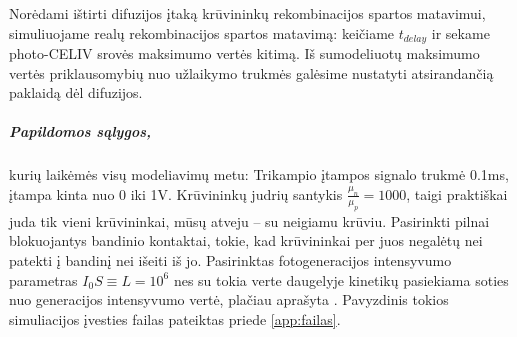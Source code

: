 Norėdami ištirti difuzijos įtaką krūvininkų rekombinacijos spartos matavimui, simuliuojame realų rekombinacijos spartos matavimą: keičiame \(t_{delay}\) ir sekame photo-CELIV srovės maksimumo vertės kitimą. Iš sumodeliuotų maksimumo vertės priklausomybių nuo užlaikymo trukmės galėsime nustatyti atsirandančią paklaidą dėl difuzijos.

\subparagraph*{Papildomos sąlygos,}\label{page:params} kurių laikėmės visų modeliavimų metu: Trikampio įtampos signalo trukmė 0.1ms, įtampa kinta nuo 0 iki 1V. Krūvininkų judrių santykis \(\frac{\mu_n}{\mu_p} = 1000\), taigi praktiškai juda tik vieni krūvininkai, mūsų atveju -- su neigiamu krūviu. Pasirinkti pilnai blokuojantys bandinio kontaktai, tokie, kad krūvininkai per juos negalėtų nei patekti į bandinį  nei išeiti iš jo.
Pasirinktas fotogeneracijos intensyvumo parametras \(I_0 S \equiv L = 10^6 \) nes su tokia verte daugelyje kinetikų pasiekiama soties nuo generacijos intensyvumo vertė, plačiau aprašyta \cite{juška:155202}. Pavyzdinis tokios simuliacijos įvesties failas pateiktas priede \ref{app:failas}.
